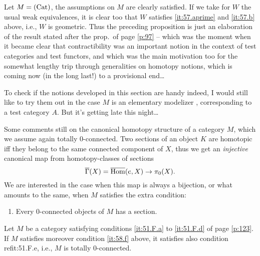 \begin{example}
  Let $M={(\mathrm{Cat})}$, the assumptions on $M$ are clearly satisfied. If we
  take for $W$ the usual weak equivalences, it is clear too that $W$
  satisfies \ref{it:57.aprime} and \ref{it:57.b} above, i.e., $W$ is
  geometric. Thus the preceding proposition is just an elaboration of
  the result stated after the prop.\ of page \ref{p:97} -- which was
  the moment when it became clear that contractibility was an
  important notion in the context of test categories and test
  functors, and which was the main motivation too for the somewhat
  lengthy trip through generalities on homotopy notions, which is
  coming now (in the long last!) to a provisional end\ldots
\end{example}

To check if the notions developed in this section are handy indeed, I
would still like to try them out in the case $M$ is an elementary
modelizer \Ahat, corresponding to a test category $A$. But it's
getting late this night\ldots

\bigbreak
\noindent\hfill{}\par

\label{sec:58}%
Some comments still on the canonical homotopy structure of a category
$M$, which we assume again totally $0$-connected. Two sections of an
object $K$ are homotopic if{f} they belong to the same connected
component of $X$, thus we get an \emph{injective} canonical map from
homotopy-classes of sections
\[\overline\Gamma(X)=\operatorname{\overline{Hom}}(e,X) \to \pi_0(X).\]
We are interested in the case when this map is always a bijection, or
what amounts to the same, when $M$ satisfies the extra condition:
\begin{enumerate}[label=\alph*),start=6]
\item\label{it:58.f}
  Every $0$-connected objects of $M$ has a section.
\end{enumerate}
\begin{proposition}
  Let $M$ be a category satisfying conditions \textup{\ref{it:51.F.a}} to
  \textup{\ref{it:51.F.d}} of page \ref{p:123}. If $M$ satisfies
  moreover condition \textup{\ref{it:58.f}} above, it satisfies also
  condition \textup{ref{it:51.F.e}}, i.e., $M$ is totally $0$-connected.
\end{proposition}

